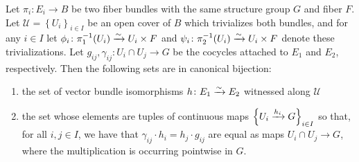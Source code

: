 \documentclass[11pt]{book}
\begin{document}
\begin{theorem}\label{thm:fiber-bundle-iso} Let $\pi_i \colon E_i \to B$ be two fiber bundles with the same structure group $G$ and fiber $F$. Let $\mathcal{U} = \left\{ U_i \right\}_{i \in I}$ be an open cover of $B$ which trivializes both bundles, and for any $i \in I$ let $\phi_i \colon \pi_1^{-1}(U_i) \xrightarrow{\sim} U_i \times F$ and $\psi_i \colon \pi_2^{-1}(U_i) \xrightarrow{\sim} U_i \times F$ denote these trivializations. Let $g_{ij}, \gamma_{ij} \colon U_i\cap U_j \to G$ be the cocycles attached to $E_1$ and $E_2$, respectively. Then the following sets are in canonical bijection:
\begin{enumerate}
    \item the set of vector bundle isomorphisms $h \colon E_1 \xrightarrow{\sim} E_2$ witnessed along $\mathcal{U}$
    \item the set whose elements are tuples of continuous maps $\left\{ U_i \xrightarrow{h_i} G \right\}_{i\in I}$ so that, for all $i,j \in I$, we have that $\gamma_{ij}\cdot h_i = h_j \cdot g_{ij}$ are equal as maps $U_i \cap U_j \to G$, where the multiplication is occurring pointwise in $G$.
\end{enumerate}
\end{theorem}
\end{document}

